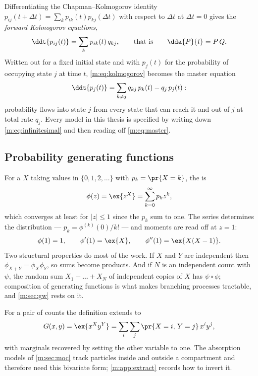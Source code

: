 Differentiating the Chapman--Kolmogorov identity
$p_{ij}(t+\Delta t) = \sum_k p_{ik}(t)p_{kj}(\Delta t)$ with respect to $\Delta t$
at $\Delta t=0$ gives the \emph{forward Kolmogorov equations},
\begin{equation}
\label{m:eq:kolmogorov}
\ddt{p_{ij}(t)} = \sum_{k} p_{ik}(t)\,q_{kj},
\qquad\text{that is}\qquad
\dda{P}{t} = P\,Q .
\end{equation}
Written out for a fixed initial state and with $p_j(t)$ for the probability of
occupying state $j$ at time $t$, \cref{m:eq:kolmogorov} becomes the master equation
\begin{equation}
\label{m:eq:master}
\ddt{p_j(t)} = \sum_{k\neq j}q_{kj}\,p_k(t) - q_j\,p_j(t):
\end{equation}
probability flows into state $j$ from every state that can reach it and out of $j$
at total rate $q_j$. Every model in this thesis is specified by writing down
\cref{m:eq:infinitesimal} and then reading off \cref{m:eq:master}.

\subsection{Probability generating functions}
\label{m:sec:pgf}

For a \rv{} $X$ taking values in $\{0,1,2,\dots\}$ with $p_k = \pr{X=k}$, the
\pgf{} is
\begin{equation}
\label{m:eq:pgfdef}
\phi(z) = \ex{z^X} = \sum_{k=0}^{\infty}p_k z^k ,
\end{equation}
which converges at least for $|z|\le1$ since the $p_k$ sum to one. The series
determines the distribution --- $p_k = \phi^{(k)}(0)/k!$ --- and moments are read
off at $z=1$:
\begin{equation}
\label{m:eq:pgfmoments}
\phi(1) = 1,
\qquad
\phi'(1) = \ex{X},
\qquad
\phi''(1) = \ex{X(X-1)} .
\end{equation}
Two structural properties do most of the work. If $X$ and $Y$ are independent then
$\phi_{X+Y} = \phi_X\phi_Y$, so sums become products. And if $N$ is an independent
count with \pgf{} $\psi$, the random sum $X_1+\dots+X_N$ of independent copies of
$X$ has \pgf{} $\psi\circ\phi$; composition of generating functions is what makes
branching processes tractable, and \cref{m:sec:gw} rests on it.

For a pair of counts the definition extends to
\begin{equation}
\label{m:eq:pgfbivariate}
G(x,y) = \ex{x^{X}y^{Y}} = \sum_{i}\sum_{j}\pr{X=i,\,Y=j}\,x^iy^j ,
\end{equation}
with marginals recovered by setting the other variable to one. The absorption
models of \cref{m:sec:moc} track particles inside and outside a compartment and
therefore need this bivariate form; \cref{m:app:extract} records how to invert it.

